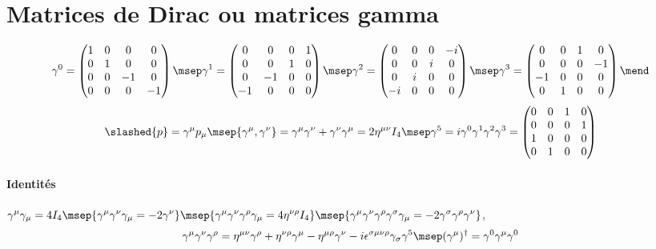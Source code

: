 \documentclass{article}
\begin{document}
\section{Matrices de Dirac ou matrices gamma}
\begin{align*}
\gamma^{0} = \begin{pmatrix}1&0&0&0\\0&1&0&0\\0&0&-1&0\\0&0&0&-1\end{pmatrix} \msep
\gamma^{1} = \begin{pmatrix}0&0&0&1\\0&0&1&0\\0&-1&0&0\\-1&0&0&0\end{pmatrix} \msep
\gamma^{2} = \begin{pmatrix}0&0&0&-i\\0&0&i&0\\0&i&0&0\\-i&0&0&0\end{pmatrix} \msep
\gamma^{3} = \begin{pmatrix}0&0&1&0\\0&0&0&-1\\-1&0&0&0\\0&1&0&0\end{pmatrix} \mend
\end{align*}
\begin{align*}
\slashed{p} = \gamma^\mu p_\mu
\msep
\{\gamma ^{\mu },\gamma ^{\nu }\}=\gamma ^{\mu }\gamma ^{\nu }+\gamma ^{\nu }\gamma ^{\mu }=2\eta ^{\mu \nu }I_{4}
\msep
\gamma^{5} = i\gamma^{0}\gamma^{1}\gamma^{2}\gamma^{3} = \begin{pmatrix}0&0&1&0\\0&0&0&1\\1&0&0&0\\0&1&0&0\end{pmatrix}
\end{align*}
\paragraph{Identités} ${\displaystyle \displaystyle \gamma ^{\mu }\gamma _{\mu }=4I_{4}}
\msep
{\displaystyle \displaystyle \gamma ^{\mu }\gamma ^{\nu }\gamma _{\mu }=-2\gamma ^{\nu }}
\msep
{\displaystyle \displaystyle \gamma ^{\mu }\gamma ^{\nu }\gamma ^{\rho }\gamma _{\mu }=4\eta ^{\nu \rho }I_{4}}
\msep
{\displaystyle \displaystyle \gamma ^{\mu }\gamma ^{\nu }\gamma ^{\rho }\gamma ^{\sigma }\gamma _{\mu }=-2\gamma ^{\sigma }\gamma ^{\rho }\gamma ^{\nu }}$,
\begin{gather*}
{\displaystyle \displaystyle \gamma ^{\mu }\gamma ^{\nu }\gamma ^{\rho }=\eta ^{\mu \nu }\gamma ^{\rho }+\eta ^{\nu \rho }\gamma ^{\mu }-\eta ^{\mu \rho }\gamma ^{\nu }-i\epsilon ^{\sigma \mu \nu \rho }\gamma _{\sigma }\gamma ^{5}}
\msep
(\gamma ^{\mu })^\dagger = \gamma^0\gamma^\mu\gamma^0
\end{gather*}
\end{document}
